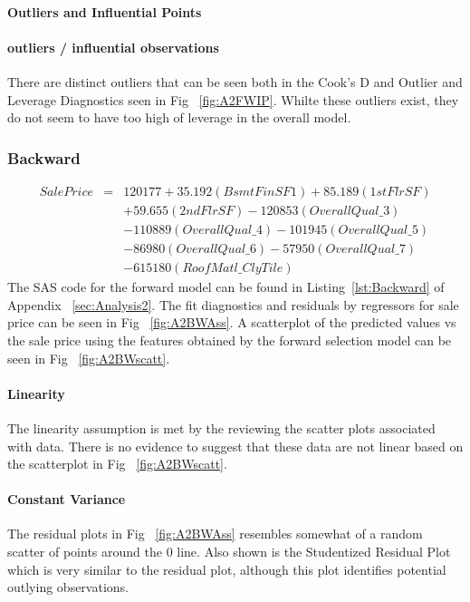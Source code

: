 \documentclass[11pt]{scrartcl} %
\begin{document}
\paragraph{Outliers and Influential Points}
\paragraph{outliers / influential observations} There are distinct outliers that can be seen both in the Cook's D and Outlier and Leverage Diagnostics seen in Fig ~\ref{fig:A2FWIP}. Whilte these outliers exist, they do not seem to have too high of leverage in the overall model.

\subsubsection{Backward}
\begin{eqnarray*}
SalePrice &=& 120177 + 35.192(BsmtFinSF1) + 85.189(1stFlrSF) \\
& & + 59.655(2ndFlrSF) - 120853(OverallQual\_3)\\
& & - 110889(OverallQual\_4) - 101945(OverallQual\_5)\\
& & - 86980(OverallQual\_6) - 57950(OverallQual\_7) \\
& & - 615180(RoofMatl\_ClyTile)
\end{eqnarray*}
The SAS code for the forward model can be found in Listing~\ref{lst:Backward} of Appendix ~\ref{sec:Analysis2}.
The fit diagnostics and residuals by regressors for sale price can be seen in Fig ~\ref{fig:A2BWAss}. A scatterplot of the predicted values vs the sale price using the features obtained by the forward selection model can be seen in Fig ~\ref{fig:A2BWscatt}.
\paragraph{Linearity} The linearity assumption is met by the reviewing the scatter plots associated with data. There is no evidence to suggest that these data are not linear based on the scatterplot in Fig ~\ref{fig:A2BWscatt}.
\paragraph{Constant Variance} The residual plots in Fig ~\ref{fig:A2BWAss} resembles somewhat of a random scatter of points around the 0 line. Also shown is the Studentized Residual Plot which is very similar to the residual plot, although this plot identifies potential outlying observations.
\end{document}
